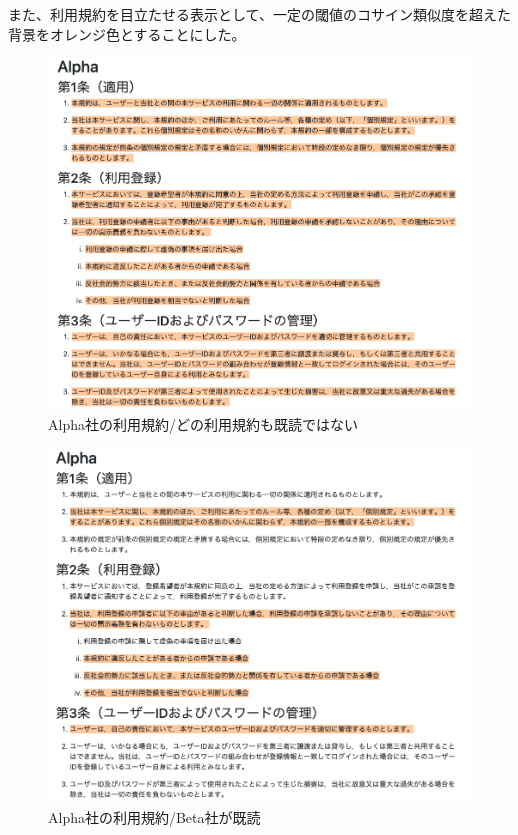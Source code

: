 また、利用規約を目立たせる表示として、一定の閾値のコサイン類似度を超えた背景をオレンジ色とすることにした。
\begin{figure}[h]
  \begin{center}
      \includegraphics[width=16cm]{img/alpha.png}
      \caption{Alpha社の利用規約/どの利用規約も既読ではない}
      \label{img:Alpha社の利用規約/どの利用規約も既読ではない}
  \end{center}
\end{figure}
\begin{figure}[h]
  \begin{center}
      \includegraphics[width=16cm]{img/alpha_b.png}
      \caption{Alpha社の利用規約/Beta社が既読}
      \label{img:Alpha社の利用規約/Beta社が既読}
  \end{center}
\end{figure}
